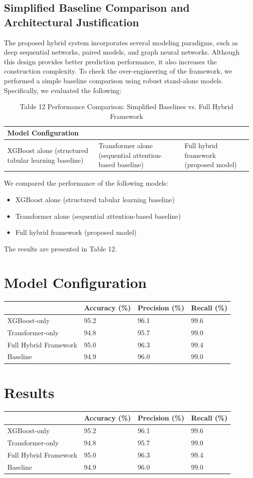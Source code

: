 \documentclass[twocolumn]{svjour3}
\begin{document}
\subsection{Simplified Baseline Comparison and Architectural Justification}
The proposed hybrid system incorporates several modeling paradigms, such as deep sequential networks, paired models, and graph neural networks. Although this design provides better prediction performance, it also increases the construction complexity. To check the over-engineering of the framework, we performed a simple baseline comparison using robust stand-alone models. Specifically, we evaluated the following:
\begin{table}
\centering
\caption{Table 12 Performance Comparison: Simplified Baselines vs. Full Hybrid Framework}
\begin{tabular}{lll}
\hline
Model Configuration & & \\
\hline
XGBoost alone (structured tabular learning baseline) & Transformer alone (sequential attention-based baseline) & Full hybrid framework (proposed model) \\
\hline
\end{tabular}
\end{table}
We compared the performance of the following models:
\begin{itemize}
\item XGBoost alone (structured tabular learning baseline)
\item Transformer alone (sequential attention-based baseline)
\item Full hybrid framework (proposed model)
\end{itemize}
The results are presented in Table 12.

\section{Model Configuration}
\begin{tabular}{llll}
\hline
& Accuracy (\%) & Precision (\%) & Recall (\%) \\
\hline
XGBoost-only & 95.2 & 96.1 & 99.6 \\
Transformer-only & 94.8 & 95.7 & 99.0 \\
Full Hybrid Framework & 95.0 & 96.3 & 99.4 \\
Baseline & 94.9 & 96.0 & 99.0 \\
\hline
\end{tabular}
\section{Results}
\begin{tabular}{llll}
\hline
& Accuracy (\%) & Precision (\%) & Recall (\%) \\
\hline
XGBoost-only & 95.2 & 96.1 & 99.6 \\
Transformer-only & 94.8 & 95.7 & 99.0 \\
Full Hybrid Framework & 95.0 & 96.3 & 99.4 \\
Baseline & 94.9 & 96.0 & 99.0 \\
\hline
\end{tabular}
\end{document}
